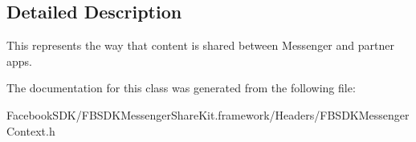 \subsection{Detailed Description}
This represents the way that content is shared between Messenger and partner apps. 

The documentation for this class was generated from the following file\-:\begin{DoxyCompactItemize}
\item 
Facebook\-S\-D\-K/\-F\-B\-S\-D\-K\-Messenger\-Share\-Kit.\-framework/\-Headers/F\-B\-S\-D\-K\-Messenger\-Context.\-h\end{DoxyCompactItemize}
